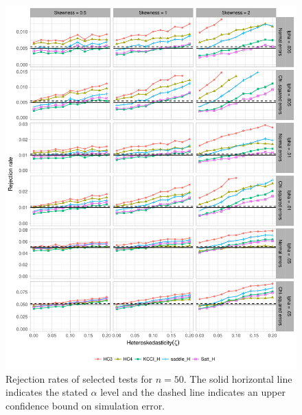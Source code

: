 \documentclass[12pt]{article}\usepackage[]{graphicx}\usepackage[]{color}
\newenvironment{knitrout}{}{} %
\begin{document}
\begin{knitrout}
\color{fgcolor}\begin{figure}[p]

{\centering \includegraphics[width=\linewidth]{HC_fig/selected_size_50-1} 

}

\caption[Rejection rates of selected tests for $n = 50$]{Rejection rates of selected tests for $n = 50$. The solid horizontal line indicates the stated $\alpha$ level and the dashed line indicates an upper confidence bound on simulation error.}\label{fig:selected_size_50}
\end{figure}


\end{knitrout}
\end{document}
